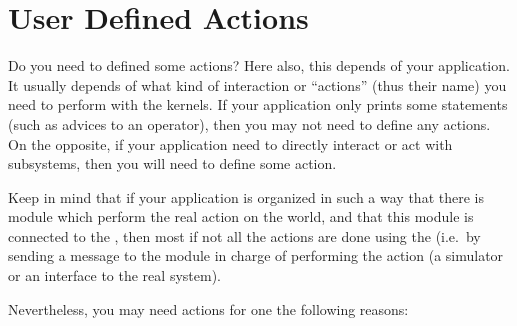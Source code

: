 \section{User Defined Actions}

Do you need to defined some actions? Here also, this depends of your
application. It usually depends of what kind of interaction or
``actions'' (thus their name) you need to perform with the kernels.
If your application only prints some statements (such as advices to an
operator), then you may not need to define any actions. On the opposite,
if your application need to directly interact or act with subsystems,
then you will need to define some action.

Keep in mind that if your application is organized in such a way that
there is module which perform the real action on the world, and that this
module is connected to the \MPA{}, then most if not all the actions are
done using the \MPA{} (i.e.\ by sending a message to the module in charge
of performing the action (a simulator or an interface to the real system).

Nevertheless, you may need actions for one the following reasons:

